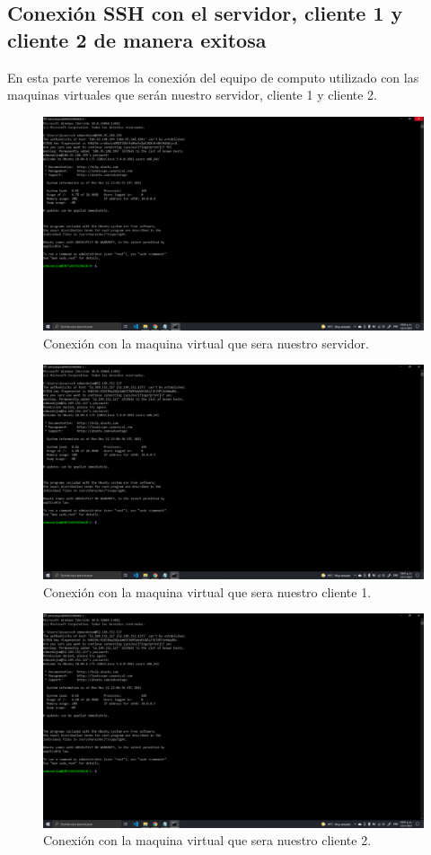 \documentclass[11pt]{article}
\begin{document}
		\subsection{Conexión SSH con el servidor, cliente 1 y cliente 2 de manera exitosa}
		En esta parte veremos la conexión del equipo de computo utilizado con las maquinas virtuales que serán nuestro servidor, cliente 1 y cliente 2.
		\begin{figure}[H]
			\centering
			\includegraphics[scale=0.34]{resources/sshconexion0.png}
			\caption{Conexión con la maquina virtual que sera nuestro servidor.}\label{fig:picture}
		\end{figure}
		\begin{figure}[H]
			\centering
			\includegraphics[scale=0.34]{resources/sshconexion1.png}
			\caption{Conexión con la maquina virtual que sera nuestro cliente 1.}\label{fig:picture}
		\end{figure}
		\begin{figure}[H]
			\centering
			\includegraphics[scale=0.34]{resources/sshconexion1.png}
			\caption{Conexión con la maquina virtual que sera nuestro cliente 2.}\label{fig:picture}
		\end{figure}		
\end{document}
